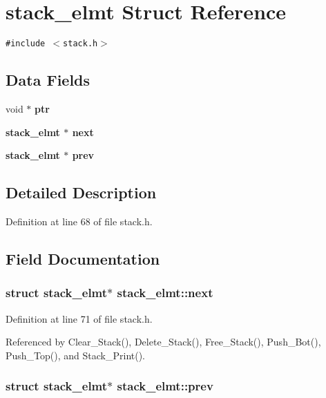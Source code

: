 \section{stack\_\-elmt Struct Reference}
\label{structstack__elmt}
{\tt \#include $<$stack.h$>$}

\subsection*{Data Fields}
\begin{CompactItemize}
\item 
void $\ast$ \bf{ptr}
\item 
\bf{stack\_\-elmt} $\ast$ \bf{next}
\item 
\bf{stack\_\-elmt} $\ast$ \bf{prev}
\end{CompactItemize}


\subsection{Detailed Description}




Definition at line 68 of file stack.h.

\subsection{Field Documentation}
\subsubsection{\setlength{\rightskip}{0pt plus 5cm}struct \bf{stack\_\-elmt}$\ast$ \bf{stack\_\-elmt::next}}\label{structstack__elmt_3beb7e9d0bd0dfeab507f438e78ab670}




Definition at line 71 of file stack.h.

Referenced by Clear\_\-Stack(), Delete\_\-Stack(), Free\_\-Stack(), Push\_\-Bot(), Push\_\-Top(), and Stack\_\-Print().
\subsubsection{\setlength{\rightskip}{0pt plus 5cm}struct \bf{stack\_\-elmt}$\ast$ \bf{stack\_\-elmt::prev}}\label{structstack__elmt_6cb1b15382935ed6e7903477bf7286fe}




